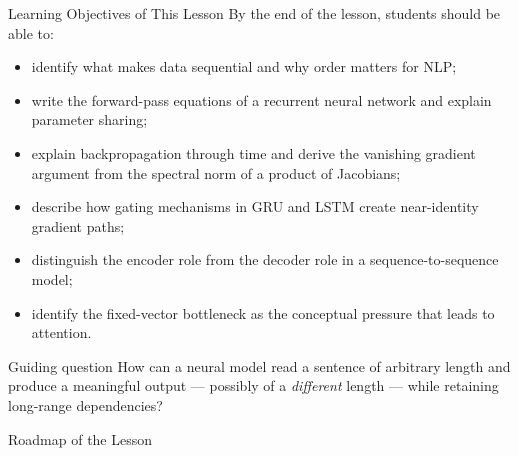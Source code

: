 \documentclass[aspectratio=169]{beamer}
\begin{document}
%
%
\begin{frame}{Learning Objectives of This Lesson}
\small
By the end of the lesson, students should be able to:
\begin{itemize}
    \item identify what makes data sequential and why order matters for NLP;
    \item write the forward-pass equations of a recurrent neural network and explain parameter sharing;
    \item explain backpropagation through time and derive the vanishing gradient argument
          from the spectral norm of a product of Jacobians;
    \item describe how gating mechanisms in GRU and LSTM create near-identity gradient paths;
    \item distinguish the encoder role from the decoder role in a sequence-to-sequence model;
    \item identify the fixed-vector bottleneck as the conceptual pressure that leads to attention.
\end{itemize}

\begin{alertblock}{Guiding question}
How can a neural model read a sentence of arbitrary length and produce a meaningful output ---
possibly of a \emph{different} length --- while retaining long-range dependencies?
\end{alertblock}
\end{frame}
%
%
\begin{frame}{Roadmap of the Lesson}
\tableofcontents
\end{frame}
%
\end{document}
